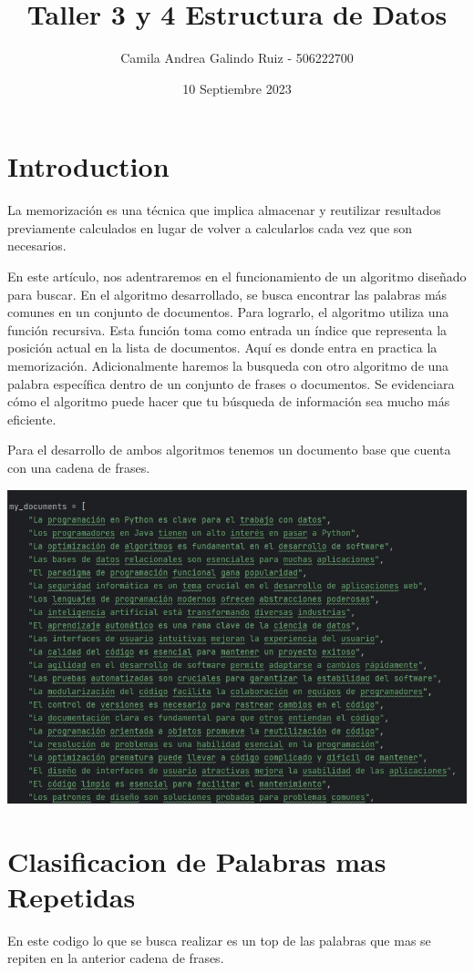 \documentclass[a4paper,twocolumn,10pt]{article}
\title{Taller 3 y 4 Estructura de Datos}
\author{Camila Andrea Galindo Ruiz - 506222700 }
\date{10 Septiembre 2023}
\begin{document}
\maketitle

\section{Introduction}

La memorización es una técnica que implica almacenar y reutilizar resultados previamente calculados en lugar de volver a calcularlos cada vez que son necesarios.

En este artículo, nos adentraremos en el funcionamiento de un algoritmo diseñado para buscar. En el algoritmo desarrollado, se busca encontrar las palabras más comunes en un conjunto de documentos. Para lograrlo, el algoritmo utiliza una función recursiva. Esta función toma como entrada un índice que representa la posición actual en la lista de documentos. Aquí es donde entra en practica la memorización. Adicionalmente haremos la busqueda con otro algoritmo de una palabra específica dentro de un conjunto de frases o documentos. Se evidenciara cómo el algoritmo puede hacer que tu búsqueda de información sea mucho más eficiente.

Para el desarrollo de ambos algoritmos tenemos un documento base que cuenta con una cadena de frases. 

\includegraphics[width=0.8\linewidth]{imagenes/Programacion .jpg}

\section{Clasificacion de Palabras mas Repetidas }

En este codigo lo que se busca realizar es un top de las palabras que mas se repiten en la anterior cadena de frases. 
\end{document}
